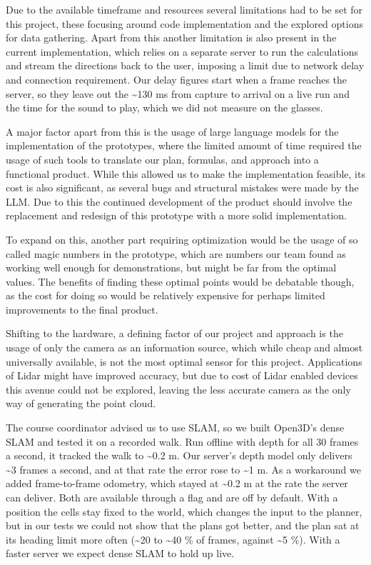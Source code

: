 \documentclass[a4paper]{article}
\begin{document}
Due to the available timeframe and resources several limitations had to be set for this project, these focusing around code implementation and the explored options for data gathering. Apart from this another limitation is also present in the current implementation, which relies on a separate server to run the calculations and stream the directions back to the user, imposing a limit due to network delay and connection requirement. Our delay figures start when a frame reaches the server, so they leave out the \textasciitilde 130 ms from capture to arrival on a live run and the time for the sound to play, which we did not measure on the glasses.

A major factor apart from this is the usage of large language models for the implementation of the prototypes, where the limited amount of time required the usage of such tools to translate our plan, formulas, and approach into a functional product. While this allowed us to make the implementation feasible, its cost is also significant, as several bugs and structural mistakes were made by the LLM. Due to this the continued development of the product should involve the replacement and redesign of this prototype with a more solid implementation.

To expand on this, another part requiring optimization would be the usage of so called magic numbers in the prototype, which are numbers our team found as working well enough for demonstrations, but might be far from the optimal values. The benefits of finding these optimal points would be debatable though, as the cost for doing so would be relatively expensive for perhaps limited improvements to the final product.

Shifting to the hardware, a defining factor of our project and approach is the usage of only the camera as an information source, which while cheap and almost universally available, is not the most optimal sensor for this project. Applications of Lidar might have improved accuracy, but due to cost of Lidar enabled devices this avenue could not be explored, leaving the less accurate camera as the only way of generating the point cloud.

The course coordinator advised us to use SLAM, so we built Open3D's dense SLAM and tested it on a recorded walk. Run offline with depth for all 30 frames a second, it tracked the walk to \textasciitilde 0.2 m. Our server's depth model only delivers \textasciitilde 3 frames a second, and at that rate the error rose to \textasciitilde 1 m. As a workaround we added frame-to-frame odometry, which stayed at \textasciitilde 0.2 m at the rate the server can deliver. Both are available through a flag and are off by default. With a position the cells stay fixed to the world, which changes the input to the planner, but in our tests we could not show that the plans got better, and the plan sat at its heading limit more often (\textasciitilde 20 to \textasciitilde 40 \% of frames, against \textasciitilde 5 \%). With a faster server we expect dense SLAM to hold up live.
\end{document}
